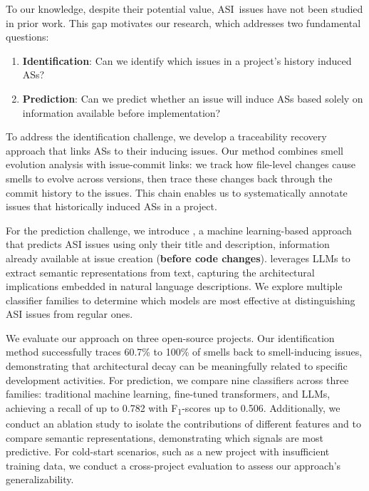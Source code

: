 To our knowledge, despite their potential value, \acl{ASI}~issues have not been studied in prior work.
This gap motivates our research, which addresses two fundamental questions:
\begin{enumerate}[label=(\roman*)]
    \item \textbf{Identification}: Can we identify which issues in a project's history induced \aclp{AS}?
    \item \textbf{Prediction}: Can we predict whether an issue will induce \aclp{AS} based solely on information available before implementation?
\end{enumerate}





To address the identification challenge, we develop a traceability recovery approach that links \aclp{AS} to their inducing issues.
Our method combines smell evolution analysis with issue-commit links: we track how file-level changes cause smells to evolve across versions, then trace these changes back through the commit history to the issues.
This chain enables us to systematically annotate issues that historically induced \aclp{AS} in a project.

For the prediction challenge, we introduce \textbf{\approach}, a machine learning-based approach that predicts \acl{ASI} issues using only their title and description, information already available at issue creation (\textbf{before code changes}).
\approach leverages \acp{LLM} to extract semantic representations from text, capturing the architectural implications embedded in natural language descriptions.
We explore multiple classifier families to determine which models are most effective at distinguishing \acl{ASI} issues from regular ones.

We evaluate our approach on three open-source projects.
Our identification method successfully traces 60.7\% to 100\% of smells back to smell-inducing issues, demonstrating that architectural decay can be meaningfully related to specific development activities.
For prediction, we compare nine classifiers across three families: traditional machine learning, fine-tuned transformers, and \acp{LLM}, achieving a recall of up to 0.782 with F\textsubscript{1}-scores up to 0.506.
Additionally, we conduct an ablation study to isolate the contributions of different features and to compare semantic representations, demonstrating which signals are most predictive.
For cold-start scenarios, such as a new project with insufficient training data, we conduct a cross-project evaluation to assess our approach's generalizability.  


